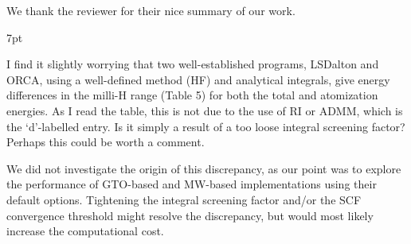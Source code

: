 \documentclass[11pt]{article}
\newenvironment{formal}{%
  \def\FrameCommand{%
    \hspace{1pt}%
    {\color{darkblue}\vrule width 2pt}%
    {\color{formalshade}\vrule width 4pt}%
    \colorbox{formalshade}%
  }%
  \MakeFramed{\advance\hsize-\width\FrameRestore}%
  \noindent\hspace{-4.55pt}%
  \begin{adjustwidth}{}{7pt}%
  \vspace{2pt}\vspace{2pt}%
}
{%
  \vspace{2pt}\end{adjustwidth}\endMakeFramed%
}
\begin{document}
We thank the reviewer for their nice summary of our work.

\begin{formal}
I find it slightly worrying that two well-established programs, LSDalton and ORCA, using a well-defined method (HF) and analytical integrals, give energy differences in the milli-H range (Table 5) for both the total and atomization energies. As I read the table, this is not due to the use of RI or ADMM, which is the ‘d’-labelled entry. Is it simply a result of a too loose integral screening factor? Perhaps this could be worth a comment.
\end{formal}

We did not investigate the origin of this discrepancy, as our point was to explore the performance of GTO-based and MW-based implementations using their default options. Tightening the integral screening factor and/or the SCF convergence threshold might resolve the discrepancy, but would most likely increase the computational cost.
\end{document}

